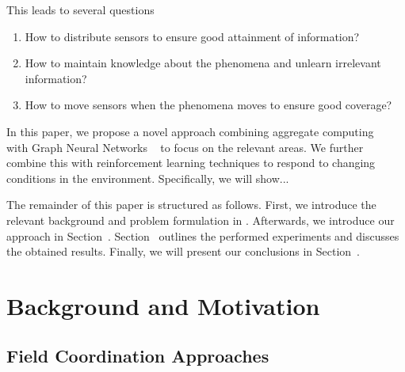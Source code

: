 \documentclass[conference]{IEEEtran}
\begin{document}
This leads to several questions 
\begin{enumerate}
	\item How to distribute sensors to ensure good attainment of information?
	\item How to maintain knowledge about the phenomena and unlearn irrelevant information?
	\item How to move sensors when the phenomena moves to ensure good coverage?
\end{enumerate} 

In this paper, we propose a novel approach combining aggregate computing
~\cite{Beal2015Computer} with Graph Neural Networks
~\cite{Zhou2020AIOpen} to focus on the relevant areas. We further combine this with reinforcement learning techniques to respond to changing conditions in the environment.
Specifically, we will show... 

The remainder of this paper is structured as follows. First, we introduce the relevant background and problem formulation in . Afterwards, we introduce our approach in Section~. Section~ outlines the performed experiments and discusses the obtained results. Finally, we will present our conclusions in Section~.


\section{Background and Motivation}
\label{sec:background}
\subsection{Field Coordination Approaches}
\end{document}
